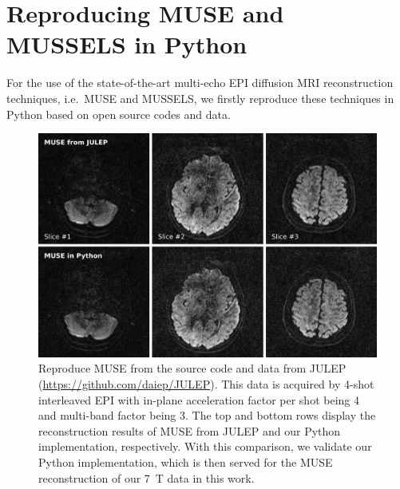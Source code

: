 \documentclass[preprint,12pt,authoryear,review]{elsarticle}
\begin{document}
	\clearpage


	\section{Reproducing MUSE and MUSSELS in Python}

	For the use of the state-of-the-art multi-echo EPI diffusion MRI reconstruction techniques,
	i.e.~MUSE and MUSSELS, we firstly reproduce these techniques in Python based on open source codes and data.

	\vspace{2em}

	\begin{figure}[h]
		\centering
		\includegraphics[width=\textwidth]{../figures/supp_fig4.png}
		\caption{Reproduce MUSE from the source code and data from JULEP
			(\url{https://github.com/daiep/JULEP}).
			This data is acquired by 4-shot interleaved EPI with
			in-plane acceleration factor per shot being 4 and
			multi-band factor being 3.
			The top and bottom rows display the reconstruction results of MUSE from JULEP
			and our Python implementation, respectively.
			With this comparison, we validate our Python implementation,
			which is then served for the MUSE reconstruction of our \SI{7}{T} data
			in this work.
		}
		\label{FIG:reprod_muse}
	\end{figure}
\end{document}
